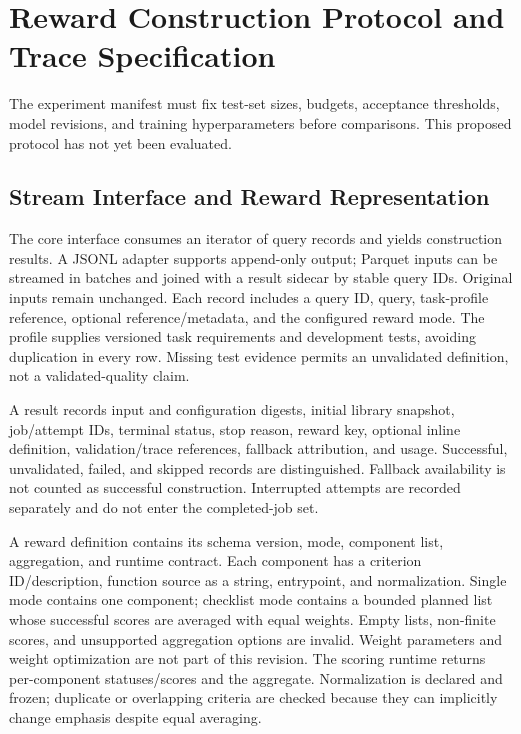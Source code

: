\section{Reward Construction Protocol and Trace Specification}
\label{apd:construction_protocol}

The experiment manifest must fix test-set sizes, budgets, acceptance thresholds, model revisions, and training hyperparameters before comparisons. This proposed protocol has not yet been evaluated.

\subsection{Stream Interface and Reward Representation}
\label{apd:harness_stream}

The core interface consumes an iterator of query records and yields construction results. A JSONL adapter supports append-only output; Parquet inputs can be streamed in batches and joined with a result sidecar by stable query IDs. Original inputs remain unchanged. Each record includes a query ID, query, task-profile reference, optional reference/metadata, and the configured reward mode. The profile supplies versioned task requirements and development tests, avoiding duplication in every row. Missing test evidence permits an unvalidated definition, not a validated-quality claim.

A result records input and configuration digests, initial library snapshot, job/attempt IDs, terminal status, stop reason, reward key, optional inline definition, validation/trace references, fallback attribution, and usage. Successful, unvalidated, failed, and skipped records are distinguished. Fallback availability is not counted as successful construction. Interrupted attempts are recorded separately and do not enter the completed-job set.

A reward definition contains its schema version, mode, component list, aggregation, and runtime contract. Each component has a criterion ID/description, function source as a string, entrypoint, and normalization. Single mode contains one component; checklist mode contains a bounded planned list whose successful scores are averaged with equal weights. Empty lists, non-finite scores, and unsupported aggregation options are invalid. Weight parameters and weight optimization are not part of this revision. The scoring runtime returns per-component statuses/scores and the aggregate. Normalization is declared and frozen; duplicate or overlapping criteria are checked because they can implicitly change emphasis despite equal averaging.

